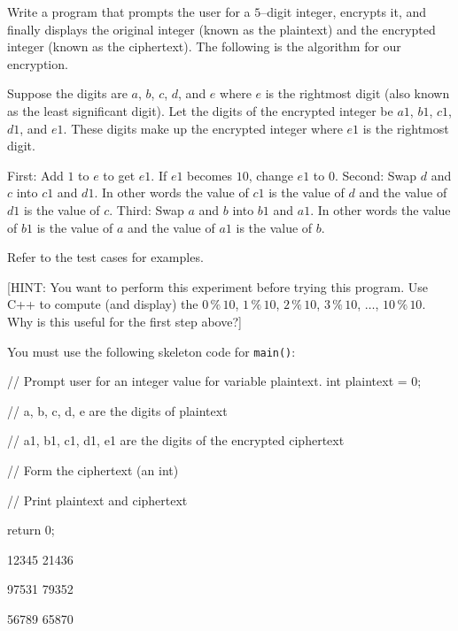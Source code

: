Write a program that prompts the user for a $5$--digit integer, encrypts it, and finally displays the original integer (known as the plaintext) and the encrypted integer (known as the ciphertext). The following is the algorithm for our encryption. 

Suppose the digits are $a$, $b$, $c$, $d$, and $e$ where $e$ is the rightmost digit (also known as the least significant digit). Let the digits of the encrypted integer be $a1$, $b1$, $c1$, $d1$, and $e1$. These digits make up the encrypted integer where $e1$ is the rightmost digit.
\begin{tightlist}
  \li First: Add $1$ to $e$ to get $e1$. If $e1$ becomes $10$, change $e1$ to $0$.
  \li Second: Swap $d$ and $c$ into $c1$ and $d1$. In other words the value of $c1$ is the value of $d$ and the value of $d1$ is the value of $c$.
  \li Third: Swap $a$ and $b$ into $b1$ and $a1$. In other words the value of $b1$ is the value of $a$ and the value of $a1$ is the value of $b$.
\end{tightlist}

Refer to the test cases for examples.

[HINT: You want to perform this experiment before trying this program. Use C++ to compute (and display) the $0\,\%\,10$, $1\,\%\,10$,  $2\,\%\,10$,  $3\,\%\,10$, $\dots$, $10\,\%\,10$. Why is this useful for the first step above?]

You must use the following skeleton code for \verb!main()!:
\begin{console}
// Prompt user for an integer value for variable plaintext.
int plaintext = 0;

// a, b, c, d, e are the digits of plaintext

// a1, b1, c1, d1, e1 are the digits of the encrypted ciphertext

// Form the ciphertext (an int)

// Print plaintext and ciphertext

return 0;
\end{console}

\resett
\nextt
\begin{console}[commandchars=\\\{\}]
12345 21436
\end{console}

\nextt
\begin{console}[commandchars=\\\{\}]
97531 79352
\end{console}

\nextt
\begin{console}[commandchars=\\\{\}]
56789 65870
\end{console}

